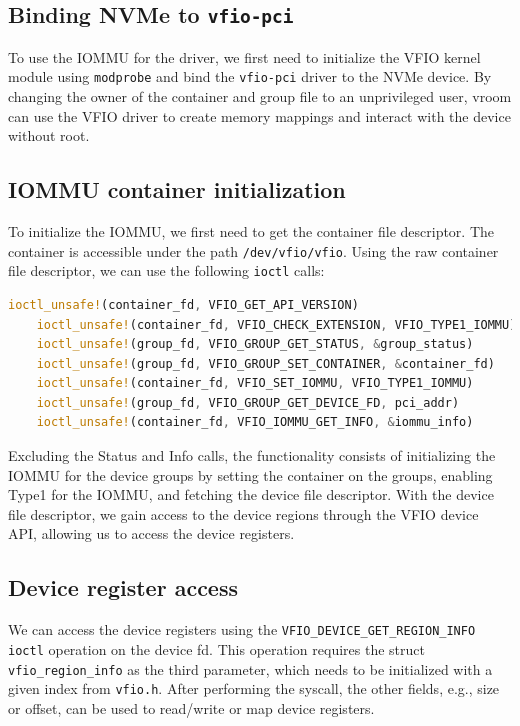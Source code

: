 \subsection{Binding NVMe to \texttt{vfio-pci}}\label{sec:bindvfiopci}
To use the IOMMU for the driver, we first need to initialize the VFIO kernel module using \texttt{modprobe} and bind the \texttt{vfio-pci} driver to the NVMe device. By changing the owner of the container and group file to an unprivileged user, vroom can use the VFIO driver to create memory mappings and interact with the device without root.

\subsection{IOMMU container initialization}\label{sec:iommuinit}
To initialize the IOMMU, we first need to get the container file descriptor. The container is accessible under the path \texttt{/dev/vfio/vfio}. Using the raw container file descriptor, we can use the following \texttt{ioctl} calls:

\begin{lstlisting}[language=Rust, caption={\texttt{ioctl} calls needed for IOMMU initialization}, label=lst:containerioctls]
    ioctl_unsafe!(container_fd, VFIO_GET_API_VERSION)
    ioctl_unsafe!(container_fd, VFIO_CHECK_EXTENSION, VFIO_TYPE1_IOMMU)
    ioctl_unsafe!(group_fd, VFIO_GROUP_GET_STATUS, &group_status)
    ioctl_unsafe!(group_fd, VFIO_GROUP_SET_CONTAINER, &container_fd)
    ioctl_unsafe!(container_fd, VFIO_SET_IOMMU, VFIO_TYPE1_IOMMU)
    ioctl_unsafe!(group_fd, VFIO_GROUP_GET_DEVICE_FD, pci_addr)
    ioctl_unsafe!(container_fd, VFIO_IOMMU_GET_INFO, &iommu_info)   
\end{lstlisting}

Excluding the Status and Info calls, the functionality consists of initializing the IOMMU for the device groups by setting the container on the groups, enabling Type1 for the IOMMU, and fetching the device file descriptor. With the device file descriptor, we gain access to the device regions through the VFIO device API, allowing us to access the device registers.

\subsection{Device register access}\label{sec:pcieconfig}
We can access the device registers using the \texttt{VFIO\_DEVICE\_GET\_REGION\_INFO} \texttt{ioctl} operation on the device fd. This operation requires the struct \texttt{vfio\_region\_info} as the third parameter, which needs to be initialized with a given index from \texttt{vfio.h}. After performing the syscall, the other fields, e.g., size or offset, can be used to read/write or map device registers.

